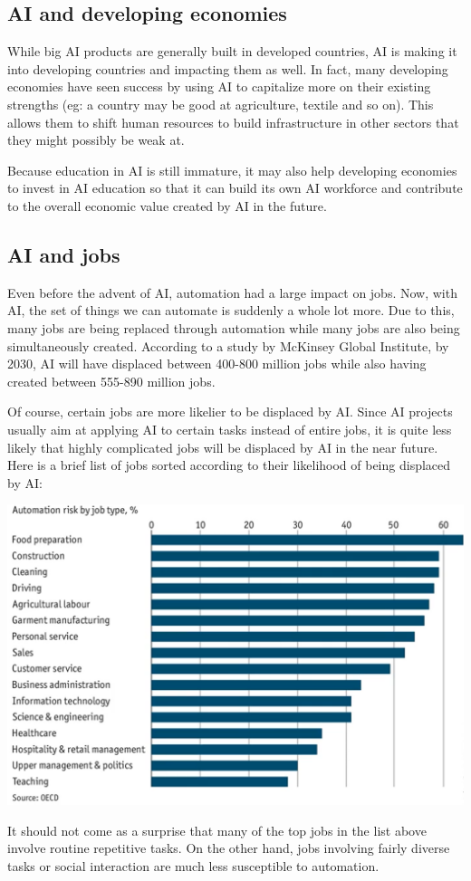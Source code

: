 \documentclass{article}[a4paper,12pt]
\theoremstyle{definition}
\begin{document}
\subsection{AI and developing economies}
While big AI products are generally built in developed countries, AI is making it into developing countries and impacting them as well. In fact, many developing economies have seen success by using AI to capitalize more on their existing strengths (eg: a country may be good at agriculture, textile and so on). This allows them to shift human resources to build infrastructure in other sectors that they might possibly be weak at.
\vspace{6pt}

Because education in AI is still immature, it may also help developing economies to invest in AI education so that it can build its own AI workforce and contribute to the overall economic value created by AI in the future.
\subsection{AI and jobs}
Even before the advent of AI, automation had a large impact on jobs. Now, with AI, the set of things we can automate is suddenly a whole lot more. Due to this, many jobs are being replaced through automation while many jobs are also being simultaneously created. According to a study by McKinsey Global Institute, by 2030, AI will have displaced between 400-800 million jobs while also having created between 555-890 million jobs.
\vspace{6pt}

Of course, certain jobs are more likelier to be displaced by AI. Since AI projects usually aim at applying AI to certain tasks instead of entire jobs, it is quite less likely that highly complicated jobs will be displaced by AI in the near future. Here is a brief list of jobs sorted according to their likelihood of being displaced by AI:
\begin{center}\includegraphics[scale=0.6]{automation_risk.png}\end{center}
It should not come as a surprise that many of the top jobs in the list above involve routine repetitive tasks. On the other hand, jobs involving fairly diverse tasks or social interaction are much less susceptible to automation.
\vspace{6pt}
\end{document}
